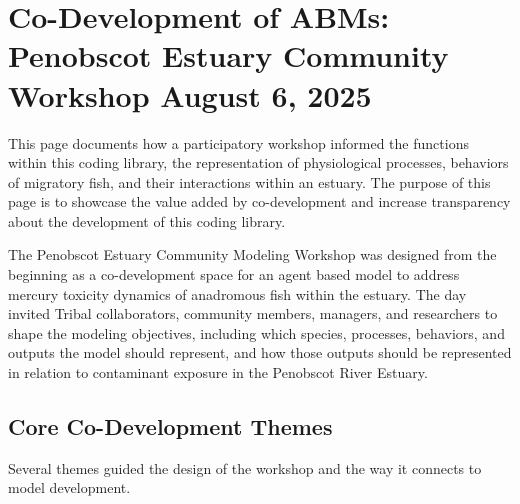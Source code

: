 \documentclass[
]{book}
\begin{document}
\chapter{Co-Development of ABMs: Penobscot Estuary Community Workshop August 6, 2025}\label{co-development-of-abms-penobscot-estuary-community-workshop-august-6-2025}

This page documents how a participatory workshop informed the functions within this coding library, the representation of physiological processes, behaviors of migratory fish, and their interactions within an estuary. The purpose of this page is to showcase the value added by co-development and increase transparency about the development of this coding library.

The Penobscot Estuary Community Modeling Workshop was designed from the beginning as a co-development space for an agent based model to address mercury toxicity dynamics of anadromous fish within the estuary. The day invited Tribal collaborators, community members, managers, and researchers to shape the modeling objectives, including which species, processes, behaviors, and outputs the model should represent, and how those outputs should be represented in relation to contaminant exposure in the Penobscot River Estuary.

\section{Core Co-Development Themes}\label{core-co-development-themes}

Several themes guided the design of the workshop and the way it connects to model development.
\end{document}
